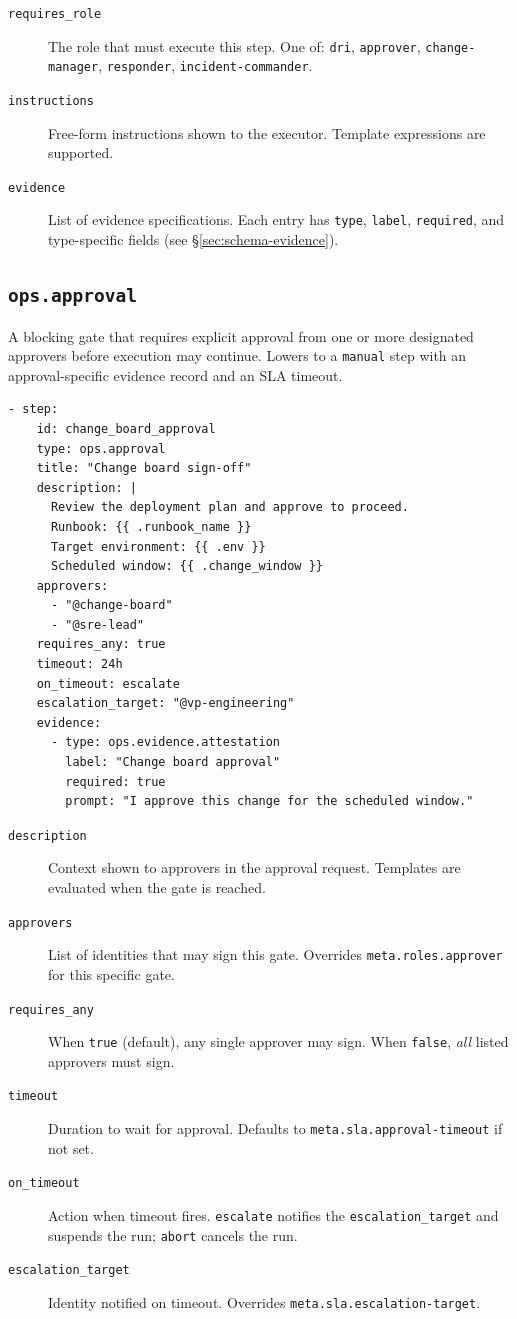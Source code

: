 \begin{description}
  \item[\texttt{requires\_role}] The role that must execute this step. One of: \texttt{dri},
    \texttt{approver}, \texttt{change-manager}, \texttt{responder}, \texttt{incident-commander}.
  \item[\texttt{instructions}] Free-form instructions shown to the executor. Template expressions
    are supported.
  \item[\texttt{evidence}] List of evidence specifications. Each entry has \texttt{type},
    \texttt{label}, \texttt{required}, and type-specific fields (see
    §\ref{sec:schema-evidence}).
\end{description}

\subsection{\texttt{ops.approval}}

A blocking gate that requires explicit approval from one or more designated approvers before
execution may continue. Lowers to a \texttt{manual} step with an approval-specific evidence
record and an SLA timeout.

\begin{verbatim}
- step:
    id: change_board_approval
    type: ops.approval
    title: "Change board sign-off"
    description: |
      Review the deployment plan and approve to proceed.
      Runbook: {{ .runbook_name }}
      Target environment: {{ .env }}
      Scheduled window: {{ .change_window }}
    approvers:
      - "@change-board"
      - "@sre-lead"
    requires_any: true
    timeout: 24h
    on_timeout: escalate
    escalation_target: "@vp-engineering"
    evidence:
      - type: ops.evidence.attestation
        label: "Change board approval"
        required: true
        prompt: "I approve this change for the scheduled window."
\end{verbatim}

\begin{description}
  \item[\texttt{description}] Context shown to approvers in the approval request. Templates
    are evaluated when the gate is reached.
  \item[\texttt{approvers}] List of identities that may sign this gate. Overrides
    \texttt{meta.roles.approver} for this specific gate.
  \item[\texttt{requires\_any}] When \texttt{true} (default), any single approver may sign.
    When \texttt{false}, \emph{all} listed approvers must sign.
  \item[\texttt{timeout}] Duration to wait for approval. Defaults to
    \texttt{meta.sla.approval-timeout} if not set.
  \item[\texttt{on\_timeout}] Action when timeout fires. \texttt{escalate} notifies the
    \texttt{escalation\_target} and suspends the run; \texttt{abort} cancels the run.
  \item[\texttt{escalation\_target}] Identity notified on timeout. Overrides
    \texttt{meta.sla.escalation-target}.
\end{description}

